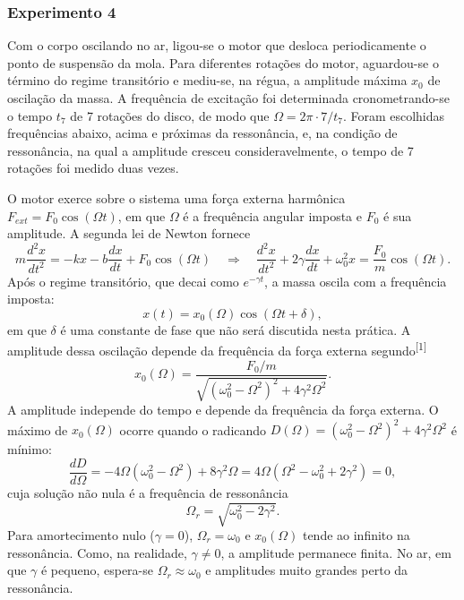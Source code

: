\documentclass[12pt, a4paper]{article}
\newcommand{\cita}[1]{\textsuperscript{[#1]}}
\begin{document}
\subsubsection{Experimento 4}

Com o corpo oscilando no ar, ligou-se o motor que desloca periodicamente o ponto de suspensão da mola. Para diferentes rotações do motor, aguardou-se o término do regime transitório e mediu-se, na régua, a amplitude máxima $x_0$ de oscilação da massa. A frequência de excitação foi determinada cronometrando-se o tempo $t_7$ de 7 rotações do disco, de modo que $\Omega=2\pi\cdot7/t_7$. Foram escolhidas frequências abaixo, acima e próximas da ressonância, e, na condição de ressonância, na qual a amplitude cresceu consideravelmente, o tempo de 7 rotações foi medido duas vezes.

O motor exerce sobre o sistema uma força externa harmônica $F_{ext}=F_0\cos(\Omega t)$, em que $\Omega$ é a frequência angular imposta e $F_0$ é sua amplitude. A segunda lei de Newton fornece
\[
m\frac{d^2x}{dt^2}=-kx-b\frac{dx}{dt}+F_0\cos(\Omega t)
\quad\Longrightarrow\quad
\frac{d^2x}{dt^2}+2\gamma\frac{dx}{dt}+\omega_0^2x=\frac{F_0}{m}\cos(\Omega t).
\]
Após o regime transitório, que decai como $e^{-\gamma t}$, a massa oscila com a frequência imposta:
\[
x(t)=x_0(\Omega)\cos(\Omega t+\delta),
\]
em que $\delta$ é uma constante de fase que não será discutida nesta prática. A amplitude dessa oscilação depende da frequência da força externa segundo\cita{1}
\begin{equation}
x_0(\Omega)=\frac{F_0/m}{\sqrt{\left(\omega_0^2-\Omega^2\right)^2+4\gamma^2\Omega^2}}.
\label{eq:x0W}
\end{equation}
A amplitude independe do tempo e depende da frequência da força externa. O máximo de $x_0(\Omega)$ ocorre quando o radicando $D(\Omega)=\left(\omega_0^2-\Omega^2\right)^2+4\gamma^2\Omega^2$ é mínimo:
\[
\frac{dD}{d\Omega}=-4\Omega\left(\omega_0^2-\Omega^2\right)+8\gamma^2\Omega
=4\Omega\left(\Omega^2-\omega_0^2+2\gamma^2\right)=0,
\]
cuja solução não nula é a frequência de ressonância
\begin{equation}
\Omega_r=\sqrt{\omega_0^2-2\gamma^2}.
\label{eq:Wr}
\end{equation}
Para amortecimento nulo ($\gamma=0$), $\Omega_r=\omega_0$ e $x_0(\Omega)$ tende ao infinito na ressonância. Como, na realidade, $\gamma\neq0$, a amplitude permanece finita. No ar, em que $\gamma$ é pequeno, espera-se $\Omega_r\approx\omega_0$ e amplitudes muito grandes perto da ressonância.
\end{document}

